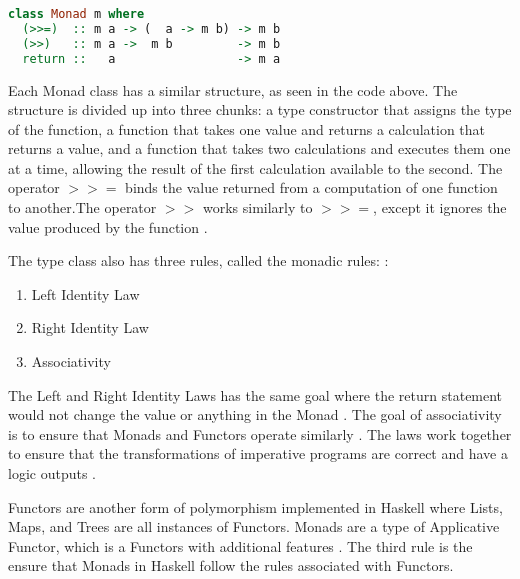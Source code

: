 \documentclass{article}
\begin{document}
\begin{lstlisting}[language=haskell]
class Monad m where
  (>>=)  :: m a -> (  a -> m b) -> m b
  (>>)   :: m a ->  m b         -> m b
  return ::   a                 -> m a
\end{lstlisting}

\medskip\noindent
Each Monad class has a similar structure, as seen in the code above. The structure is divided up into three chunks: a type constructor that assigns the type of the function, a function that takes one value and returns a calculation that returns a value, and a function that takes two calculations and executes them one at a time, allowing the result of the first calculation available to the second. The operator $>>=$ binds the value returned from a computation of one function to another.The operator $>>$ works similarly to $>>=$, except it ignores the value produced by the function \cite{FL Monads}.

\medskip\noindent
The type class also has three rules, called the monadic rules: \cite{TP Monads}:

\begin{enumerate}
    \item Left Identity Law
    \item Right Identity Law
    \item Associativity
\end{enumerate}

\noindent
The Left and Right Identity Laws has the same goal where the return statement would not change the value or anything in the Monad \cite{TP Monads}. The goal of associativity is to ensure that Monads and Functors operate similarly \cite{TP Monads}. The laws work together to ensure that the transformations of imperative programs are correct and have a logic outputs \cite{Monad Laws}.

\medskip\noindent
Functors are another form of polymorphism implemented in Haskell where Lists, Maps, and Trees are all instances of Functors. Monads are a type of Applicative Functor, which is a Functors with additional features \cite{TP Functors}. The third rule is the ensure that Monads in Haskell follow the rules associated with Functors. 
\end{document}
